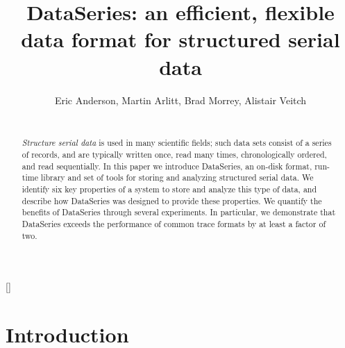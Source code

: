 \documentclass{acm_proc_article-sp}
\begin{document}
\newcommand{\DataSeries}{DataSeries}
\newcommand{\DS}{DS}

\title{DataSeries: an efficient, flexible data format for structured serial data}
\author{
\alignauthor
Eric Anderson, Martin Arlitt, Brad Morrey, Alistair Veitch  \\
  \\
}

\maketitle
[]
 


\begin{abstract}
\textit{Structure serial data} is used in many scientific fields;
such data sets consist of a series of records, and are typically
written once, read many times, chronologically ordered, and read
sequentially.
In this paper we introduce DataSeries, an on-disk format,
run-time library and set of tools for storing and analyzing 
structured serial data.
We identify six key properties of a system to store and analyze
this type of data, and describe how DataSeries was designed
to provide these properties.  We quantify the benefits of DataSeries
through several experiments.  In particular, we demonstrate
that DataSeries exceeds the performance of common trace formats
by at least a factor of two.
\end{abstract}

\section{Introduction}\label{sec:intro}
\end{document}
